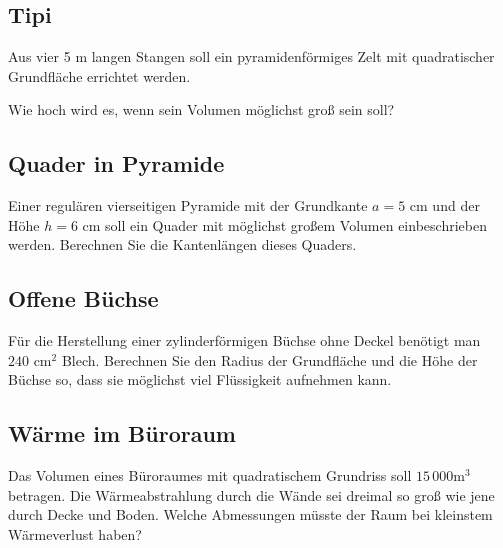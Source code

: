 
\subsection{Tipi}

Aus vier 5 m langen Stangen soll ein
pyramidenförmiges Zelt mit quadratischer Grundfläche errichtet werden.

Wie hoch wird es, wenn sein Volumen möglichst groß sein soll?



\subsection{Quader in Pyramide}
Einer regulären vierseitigen Pyramide mit der Grundkante $a = 5$ cm und der Höhe $h = 6$ cm
soll ein Quader mit möglichst großem Volumen einbeschrieben werden.
Berechnen Sie die Kantenlängen dieses Quaders.


\subsection{Offene Büchse}
Für die Herstellung einer zylinderförmigen Büchse ohne Deckel benötigt
man $240 \text{ cm}^2$ Blech. Berechnen Sie den Radius der Grundfläche und die Höhe der Büchse so, dass sie möglichst viel Flüssigkeit aufnehmen kann.





\subsection{Wärme im Büroraum}

Das Volumen eines Büroraumes mit quadratischem Grundriss soll $15\,000 \text{m}^3$ betragen. Die Wärmeabstrahlung durch die Wände sei dreimal so groß wie jene durch Decke und Boden. Welche Abmessungen müsste der Raum bei kleinstem Wärmeverlust haben?

